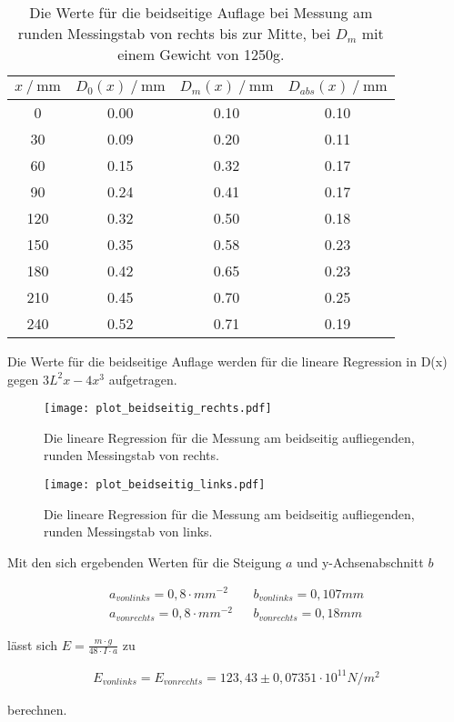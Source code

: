 \begin{table}[H]
  \centering
  \caption{Die Werte für die beidseitige Auflage bei Messung am runden Messingstab von rechts bis zur Mitte, bei $D_m$ mit 
  einem Gewicht von 1250g.}
  \begin{tabular}{cccc}
    \toprule
    {$x \mathbin{/} \unit{\milli\metre}$} &
    {$D_0(x) \mathbin{/} \unit{\milli\metre}$} &
    {$D_m(x) \mathbin{/} \unit{\milli\metre}$} &
    {$D_{abs}(x) \mathbin{/} \unit{\milli\metre}$} \\
    \midrule
      0 & 0.00 & 0.10 & 0.10 \\
     30 & 0.09 & 0.20 & 0.11 \\  
     60 & 0.15 & 0.32 & 0.17 \\
     90 & 0.24 & 0.41 & 0.17 \\
    120 & 0.32 & 0.50 & 0.18 \\
    150 & 0.35 & 0.58 & 0.23 \\
    180 & 0.42 & 0.65 & 0.23 \\
    210 & 0.45 & 0.70 & 0.25 \\
    240 & 0.52 & 0.71 & 0.19 \\
    \bottomrule
  \end{tabular}
  \label{tab:Tabelle6}
\end{table}


Die Werte für die beidseitige Auflage werden für die lineare Regression in D(x) gegen $3L^2 x - 4x^3$ aufgetragen.



\begin{figure}
  \centering
  \texttt{[image: plot\_beidseitig\_rechts.pdf]}
  \caption{Die lineare Regression für die Messung am beidseitig aufliegenden, runden Messingstab von rechts.}
  \label{fig:plot_beidseitig_rechts}
\end{figure} 

\begin{figure}
  \centering
  \texttt{[image: plot\_beidseitig\_links.pdf]}
  \caption{Die lineare Regression für die Messung am beidseitig aufliegenden, runden Messingstab von links.}
  \label{fig:plot_beidseitig_links}
\end{figure}      

Mit den sich ergebenden Werten für die Steigung $a$ und y-Achsenabschnitt $b$

\begin{align*}
  a_{von links} = 0,8 \cdot mm^{-2} && b_{von links} = 0,107 mm \\
  a_{von rechts} = 0,8 \cdot mm^{-2} && b_{von rechts} = 0,18 mm
\end{align*}

lässt sich $E = \frac{m \cdot g}{48 \cdot I \cdot a}$ zu

\begin{align*}
  E_{von links} = E_{von rechts} = 123,43 \pm 0,07351 \cdot 10^{11} N/m^2 
\end{align*}

berechnen.
